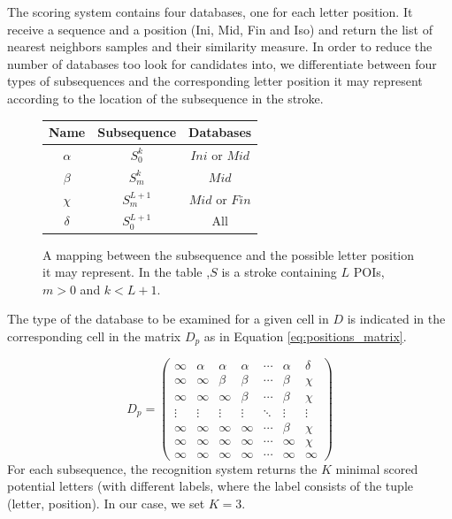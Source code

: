 \documentclass[10pt, conference, compsocconf]{IEEEtran}
\begin{document}
The scoring system contains four databases, one for each letter position. 
It receive a sequence and a position (Ini, Mid, Fin and Iso) and return the list of nearest neighbors samples and their similarity measure.
In order to reduce the number of databases too look for candidates into, we differentiate between four types of subsequences and the corresponding letter position it may represent according to the location of the subsequence in the stroke.\\
\begin{figure}
\centering
\renewcommand{\arraystretch}{2}
\begin{tabular}{| c |c | c |}
\hline
  Name     & Subsequence      & Databases       \\
\hline
  $\alpha$ & $S_0^{k}$         & $Ini$ or $Mid$  \\
\hline
  $\beta$  & $S_{m}^{k}$     & $Mid$              \\
\hline
  $\chi$    & $S_{m}^{L+1}$ & $Mid$ or $Fin$   \\
\hline
  $\delta$ & $S_0^{L+1}$     & All                   \\
\hline
\end{tabular}
\caption{A mapping between the subsequence and the possible letter position it may represent. In the table ,$S$ is a stroke containing $L$ POIs, $m>0$ and $k<L+1$.}
\label{table:subsequences_types}
\end{figure}

The type of the database to be examined for a given cell in $D$ is indicated in the corresponding cell in the matrix $D_p$ as in Equation \ref{eq:positions_matrix}. 

\begin{equation}
D_{p}=
\left( 
\begin{array}{ccccccc}
\infty 	& \alpha & \alpha & \alpha  & \cdots & \alpha & \delta \\
\infty  & \infty  & \beta   & \beta   & \cdots  & \beta  & \chi    \\
\infty  & \infty  & \infty   & \beta   & \cdots  & \beta  & \chi    \\
\vdots & \vdots & \vdots  & \vdots & \ddots  & \vdots & \vdots \\
\infty  & \infty  & \infty   & \infty   & \cdots  & \beta  & \chi    \\
\infty  & \infty  & \infty   & \infty   & \cdots  & \infty  & \chi    \\
\infty  & \infty  & \infty   & \infty   & \cdots  & \infty  & \infty \end{array} \right)
\label{eq:positions_matrix}
\end{equation}
For each subsequence, the recognition system returns the $K$ minimal scored potential letters (with different labels, where the label consists of the tuple (letter, position). In our case, we set $K=3$.\\
\end{document}
